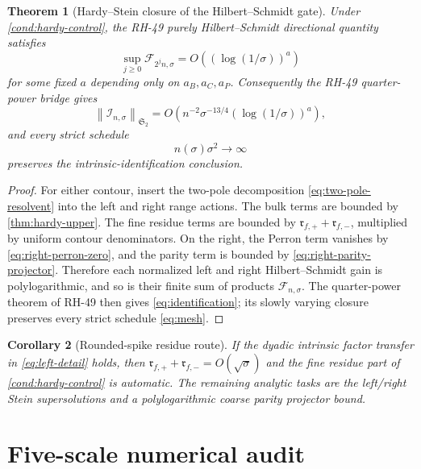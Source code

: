 \documentclass[11pt]{article}
\newtheorem{theorem}{Theorem}[section]
\newtheorem{corollary}[theorem]{Corollary}
\theoremstyle{definition}
\theoremstyle{remark}
\newcommand{\cF}{\mathcal F}
\newcommand{\HS}{\mathfrak S_2}
\newcommand{\norm}[1]{\left\lVert #1\right\rVert}
\begin{document}
\begin{theorem}[Hardy--Stein closure of the Hilbert--Schmidt gate]
\label{thm:closure}
Under \cref{cond:hardy-control}, the RH-49 purely Hilbert--Schmidt
directional quantity satisfies
\begin{equation}
 \sup_{j\ge0}\cF_{2^jn,\sigma}
 =
 O((\log(1/\sigma))^a)
 \label{eq:F-polylog}
\end{equation}
for some fixed \(a\) depending only on
\(a_B,a_C,a_P\).  Consequently the RH-49 quarter-power bridge gives
\begin{equation}
 \norm{\mathcal I_{n,\sigma}}_{\HS}
 =
 O\!\left(
 n^{-2}\sigma^{-13/4}(\log(1/\sigma))^a
 \right),
 \label{eq:identification}
\end{equation}
and every strict schedule
\begin{equation}
 n(\sigma)\sigma^2\longrightarrow\infty
 \label{eq:mesh}
\end{equation}
preserves the intrinsic-identification conclusion.
\end{theorem}

\begin{proof}
For either contour, insert the two-pole decomposition
\eqref{eq:two-pole-resolvent} into the left and right range actions.  The
bulk terms are bounded by \cref{thm:hardy-upper}.  The fine residue terms
are bounded by \(\mathfrak r_{f,+}+\mathfrak r_{f,-}\), multiplied by
uniform contour denominators.  On the right, the Perron term vanishes by
\eqref{eq:right-perron-zero}, and the parity term is bounded by
\eqref{eq:right-parity-projector}.  Therefore each normalized left and
right Hilbert--Schmidt gain is polylogarithmic, and so is their finite sum
of products \(\cF_{n,\sigma}\).  The quarter-power theorem of RH-49 then
gives \eqref{eq:identification}; its slowly varying closure preserves every
strict schedule \eqref{eq:mesh}.
\end{proof}

\begin{corollary}[Rounded-spike residue route]
\label{cor:rounded-closure}
If the dyadic intrinsic factor transfer in
\eqref{eq:left-detail} holds, then
\(\mathfrak r_{f,+}+\mathfrak r_{f,-}=O(\sqrt{\sigma})\) and the fine
residue part of \cref{cond:hardy-control} is automatic.  The remaining
analytic tasks are the left/right Stein supersolutions and a
polylogarithmic coarse parity projector bound.
\end{corollary}

\section{Five-scale numerical audit}
\label{sec:numerics}
\end{document}
